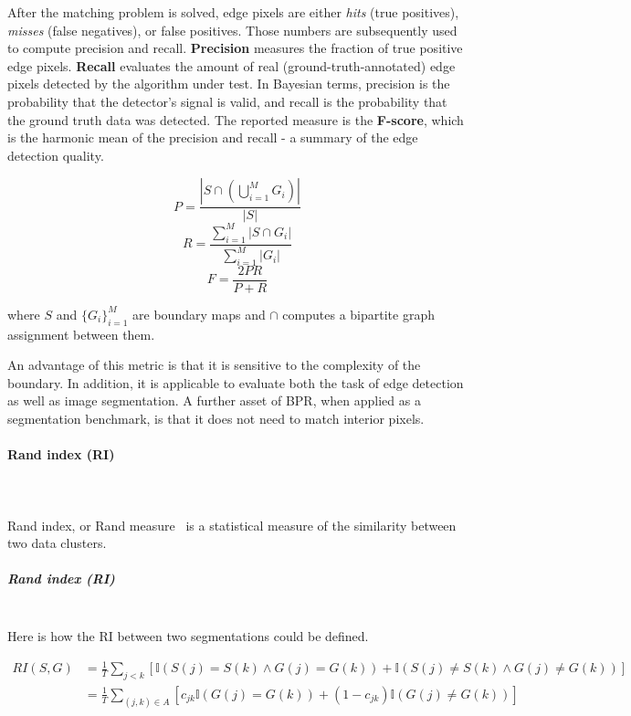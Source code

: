 After the matching problem is solved, edge pixels are either {\it hits} (true positives), {\it misses} (false negatives), or false positives. Those numbers are subsequently used to compute precision and recall. 
{\bf Precision} measures the fraction of true positive edge pixels. {\bf Recall} evaluates the amount of real (\eg ground-truth-annotated) edge pixels detected by the algorithm under test. 
In Bayesian terms, precision is the probability that the detector's signal is valid, and recall is the probability that the ground truth data was detected. 
The reported measure is the \textbf{F-score}, which is the harmonic mean of the precision and recall - a summary of the edge detection quality.


\[
P=\frac{\left|S\cap\left(\bigcup\limits _{i=1}^{M}G_{i}\right)\right|}{|S|}
\]
\[
R=\frac{{\sum\limits _{i=1}^{M}\left|S\cap G_{i}\right|}}{\sum\limits _{i=1}^{M}\left|G_{i}\right|}
\]
\[
F=\frac{2PR}{P+R}
\]

where $S$ and $\{G_{i}\}_{i=1}^{M}$ are boundary maps and $\cap$
computes a bipartite graph assignment between them.

An advantage of this  metric is that it is sensitive to the complexity of the boundary. In addition, it is applicable to evaluate both the task of edge detection as well as image segmentation. A further asset of BPR, when applied as a segmentation benchmark, is that it does not need to match interior pixels.

\paragraph{Rand index (RI)}\mbox{}\\\mbox{}\\
Rand index, or Rand measure~\cite{rand1971objective} is a statistical measure of the similarity between two data clusters.

\subparagraph{Rand index (RI)}\mbox{}\\
Here is how the RI between two segmentations could be defined.

\begin{align*}
RI(S,G) & =\frac{1}{T}\sum\limits _{j<k}\left[\mathbb{I}\left(S(j)=S(k)\wedge G(j)=G(k)\right)+\mathbb{I}\left(S(j)\neq S(k)\wedge G(j)\neq G(k)\right)\right]\\
 & =\frac{1}{T}\sum\limits _{(j,k)\in A}\left[c_{jk}\mathbb{I}\left(G(j)=G(k)\right)+(1-c_{jk})\mathbb{I}\left(G(j)\neq G(k)\right)\right]
\end{align*}

